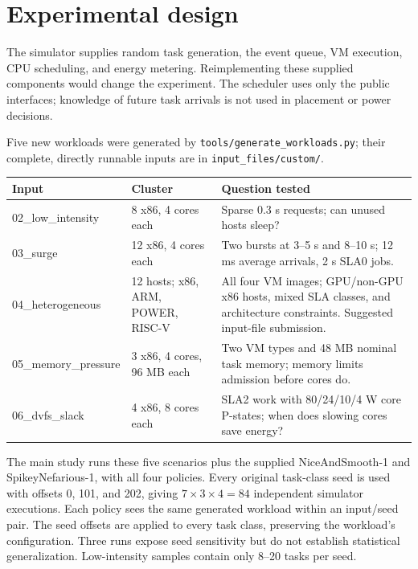 \documentclass[10pt,letterpaper]{article}
\begin{document}
\section*{Experimental design}
The simulator supplies random task generation, the event queue, VM execution, CPU
scheduling, and energy metering. Reimplementing these supplied components would
change the experiment. The scheduler uses only the public interfaces; knowledge
of future task arrivals is not used in placement or power decisions.

Five new workloads were generated by \texttt{tools/generate\_workloads.py}; their
complete, directly runnable inputs are in \texttt{input\_files/custom/}.
\begin{center}
\small
\begin{tabular}{p{1.17in}p{1.38in}p{3.75in}}
\toprule
Input & Cluster & Question tested \\
\midrule
02\_low\_intensity & 8 x86, 4 cores each & Sparse 0.3 s requests; can unused hosts sleep? \\
03\_surge & 12 x86, 4 cores each & Two bursts at 3--5 s and 8--10 s; 12 ms average arrivals, 2 s SLA0 jobs. \\
04\_heterogeneous & 12 hosts; x86, ARM, POWER, RISC-V & All four VM images; GPU/non-GPU x86 hosts, mixed SLA classes, and architecture constraints. Suggested input-file submission. \\
05\_memory\_pressure & 3 x86, 4 cores, 96 MB each & Two VM types and 48 MB nominal task memory; memory limits admission before cores do. \\
06\_dvfs\_slack & 4 x86, 8 cores each & SLA2 work with 80/24/10/4 W core P-states; when does slowing cores save energy? \\
\bottomrule
\end{tabular}
\end{center}

The main study runs these five scenarios plus the supplied NiceAndSmooth-1 and
SpikeyNefarious-1, with all four policies. Every original task-class seed is used
with offsets 0, 101, and 202, giving $7\times3\times4=84$ independent simulator
executions. Each policy sees the same generated workload within an input/seed pair.
The seed offsets are applied to every task class, preserving the workload's
configuration. Three runs expose seed sensitivity but do not establish statistical
generalization. Low-intensity samples contain only 8--20 tasks per seed.
\end{document}
